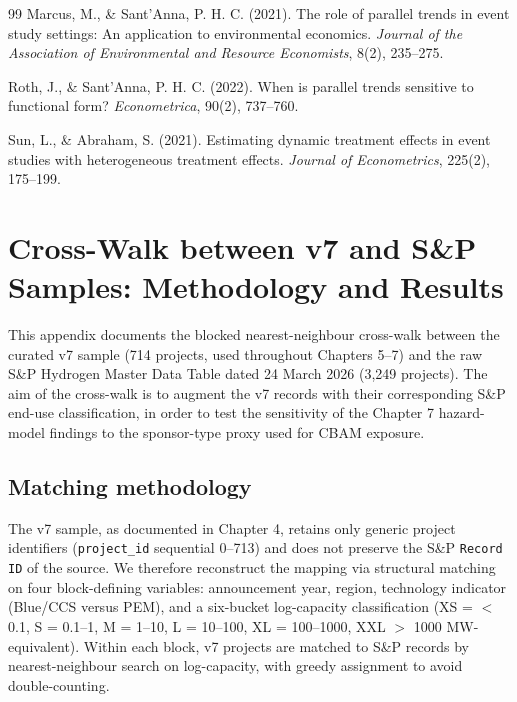 \documentclass[11pt,a4paper]{article}
\begin{document}
\begin{thebibliography}{99}
Marcus, M., \& Sant'Anna, P. H. C. (2021).
\newblock The role of parallel trends in event study settings: An application to environmental economics.
\newblock \textit{Journal of the Association of Environmental and Resource Economists}, 8(2), 235--275.

Roth, J., \& Sant'Anna, P. H. C. (2022).
\newblock When is parallel trends sensitive to functional form?
\newblock \textit{Econometrica}, 90(2), 737--760.

Sun, L., \& Abraham, S. (2021).
\newblock Estimating dynamic treatment effects in event studies with heterogeneous treatment effects.
\newblock \textit{Journal of Econometrics}, 225(2), 175--199.

\end{thebibliography}


\appendix

\section{Cross-Walk between v7 and S\&P Samples: Methodology and Results}
\label{app:matching}

This appendix documents the blocked nearest-neighbour cross-walk between the curated v7 sample (714 projects, used throughout Chapters 5--7) and the raw S\&P Hydrogen Master Data Table dated 24 March 2026 (3{,}249 projects). The aim of the cross-walk is to augment the v7 records with their corresponding S\&P end-use classification, in order to test the sensitivity of the Chapter 7 hazard-model findings to the sponsor-type proxy used for CBAM exposure.

\subsection{Matching methodology}
\label{app:matching-method}

The v7 sample, as documented in Chapter 4, retains only generic project identifiers (\texttt{project\_id} sequential 0--713) and does not preserve the S\&P \texttt{Record ID} of the source. We therefore reconstruct the mapping via structural matching on four block-defining variables: announcement year, region, technology indicator (Blue/CCS versus PEM), and a six-bucket log-capacity classification (XS = $<$0.1, S = 0.1--1, M = 1--10, L = 10--100, XL = 100--1000, XXL $>$ 1000 MW-equivalent). Within each block, v7 projects are matched to S\&P records by nearest-neighbour search on log-capacity, with greedy assignment to avoid double-counting.
\end{document}
